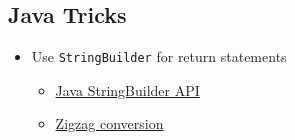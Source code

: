\documentclass{article}
\begin{document}
\begin{multicols}{2}
\section{Java Tricks}
\begin{itemize}
	\item Use \texttt{StringBuilder} for return statements
	\begin{itemize}
		\item \href{https://docs.oracle.com/javase/7/docs/api/java/lang/StringBuilder.html}{Java StringBuilder API}
		\item \href{https://leetcode.com/problems/zigzag-conversion/solution/}{Zigzag conversion}
	\end{itemize}

\end{itemize}
\end{multicols}
\end{document}
